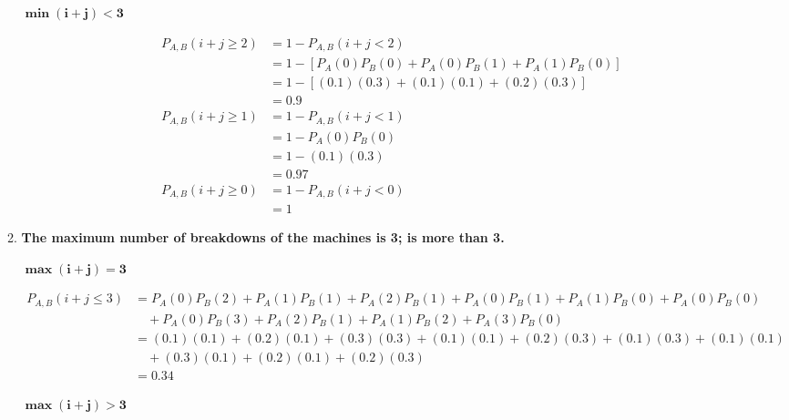 \documentclass[10pt, oneside]{article}   	%
\theoremstyle{definition}
\begin{document}
\begin{enumerate}[label=3.\arabic*]
\begin{enumerate}
	\textbf{$\boxed{\bm{\min(i+j) < 3}}$}

	\begin{align*}
	P_{A,B} (i + j \geq 2) &= 1 - P_{A,B} (i + j < 2) \\
	&= 1 - [P_A(0)P_B(0) + P_A(0)P_B(1) + P_A(1)P_B(0)] \\
	&= 1 - [(0.1)(0.3) + (0.1)(0.1) + (0.2)(0.3) ] \\
	&= \boxed{0.9} \\
	P_{A,B} (i + j \geq 1) &= 1 - P_{A,B} (i + j < 1) \\
	&= 1 - P_A(0)P_B(0) \\
	&= 1 - (0.1)(0.3) \\
	&= \boxed{0.97} \\
	P_{A,B} (i + j \geq 0) &= 1 - P_{A,B} (i + j < 0) \\	
	&= \boxed{1}
	\end{align*}
	
	\item  \begin{tcolorbox}[
	  colback=Cerulean!5!white,
	  colframe=Cerulean!75!black]
	\textbf{The maximum number of breakdowns of the machines is 3; is more than 3.}
	\end{tcolorbox}
	
	\textbf{$\boxed{\bm{\max(i+j) = 3}}$}
	
	\begin{align*}
	P_{A,B} (i + j \leq 3) &= P_A(0)P_B(2) + P_A(1)P_B(1) + P_A(2)P_B(1) + P_A(0)P_B(1) + P_A(1)P_B(0) + P_A(0)P_B(0) \\
	&\quad + P_A(0)P_B(3) + P_A(2)P_B(1) + P_A(1)P_B(2) + P_A(3)P_B(0) \\
	&= (0.1)(0.1) + (0.2)(0.1) + (0.3)(0.3) + (0.1)(0.1) + (0.2)(0.3) + (0.1)(0.3) + (0.1)(0.1) \\ 
	&\quad + (0.3)(0.1) + (0.2)(0.1) + (0.2)(0.3) \\
	&= \boxed{0.34}
	\end{align*}
	
	\textbf{$\boxed{\bm{\max(i+j) > 3}}$}
	

\end{enumerate}
\end{enumerate}
\end{document}
